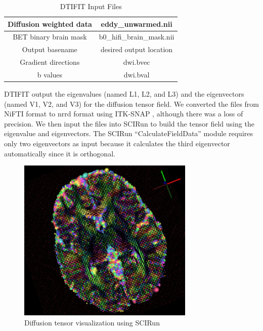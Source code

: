 \begin{table}[H]
\centering
\caption{DTIFIT Input Files}
\label{tab:dtifit}
\begin{tabular}{|c|c|}
\hline
Diffusion weighted data & eddy\_unwarmed.nii        \\ \hline
BET binary brain mask   & b0\_hifi\_brain\_mask.nii \\ \hline
Output basename          & desired output location   \\ \hline
Gradient directions     & dwi.bvec                  \\ \hline
b values                & dwi.bval                  \\ \hline
\end{tabular}
\end{table}
DTIFIT output the eigenvalues (named L1, L2, and L3) and the eigenvectors (named V1, V2, and V3) for the diffusion tensor field. We converted the files from NiFTI format to nrrd format using ITK-SNAP \cite{ref:itksnap}, although there was a loss of precision. We then input the files into SCIRun to build the tensor field using the eigenvalue and eigenvectors. The SCIRun ``CalculateFieldData'' module requires only two eigenvectors as input because it calculates the third eigenvector automatically since it is orthogonal.

\begin{figure}[H]
\begin{center}
\includegraphics[width=0.75\textwidth]{Figures/DTI_1.png}
\caption{Diffusion tensor visualization using SCIRun}
\label{fig:tensorvis}
\end{center}
\end{figure}


